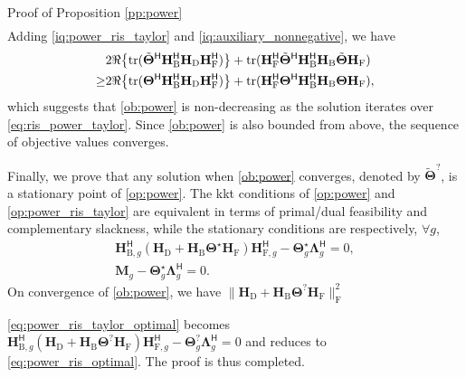 \documentclass[journal]{IEEEtran}
\begin{document}
\begin{appendix}
\begin{subsection}{Proof of Proposition \ref{pp:power}}
\begin{equation}
\begin{split}
			\end{split}
		\end{equation}
		Adding \eqref{iq:power_ris_taylor} and \eqref{iq:auxiliary_nonnegative}, we have
		\begin{equation}
			\begin{split}
				& 2 \Re \bigl\{\operatorname{tr}(\tilde{\mathbf{\Theta}}^\mathsf{H} \mathbf{H}_\mathrm{B}^\mathsf{H} \mathbf{H}_\mathrm{D} \mathbf{H}_\mathrm{F}^\mathsf{H}) \bigr\} + \operatorname{tr}(\mathbf{H}_\mathrm{F}^\mathsf{H} \tilde{\mathbf{\Theta}}^\mathsf{H} \mathbf{H}_\mathrm{B}^\mathsf{H} \mathbf{H}_\mathrm{B} \tilde{\mathbf{\Theta}} \mathbf{H}_\mathrm{F}) \\
				\ge & 2 \Re \bigl\{\operatorname{tr}({\mathbf{\Theta}}^\mathsf{H} \mathbf{H}_\mathrm{B}^\mathsf{H} \mathbf{H}_\mathrm{D} \mathbf{H}_\mathrm{F}^\mathsf{H}) \bigr\} + \operatorname{tr}(\mathbf{H}_\mathrm{F}^\mathsf{H} {\mathbf{\Theta}}^\mathsf{H} \mathbf{H}_\mathrm{B}^\mathsf{H} \mathbf{H}_\mathrm{B} {\mathbf{\Theta}} \mathbf{H}_\mathrm{F}),
			\end{split}
		\end{equation}
		which suggests that \eqref{ob:power} is non-decreasing as the solution iterates over \eqref{eq:ris_power_taylor}.
		Since \eqref{ob:power} is also bounded from above, the sequence of objective values converges.

		Finally, we prove that any solution when \eqref{ob:power} converges, denoted by $\tilde{\mathbf{\Theta}}^?$, is a stationary point of \eqref{op:power}.
		The \gls{kkt} conditions of \eqref{op:power} and \eqref{op:power_ris_taylor} are equivalent in terms of primal/dual feasibility and complementary slackness, while the stationary conditions are respectively, $\forall g$,
		\begin{gather}
			\mathbf{H}_{\mathrm{B},g}^\mathsf{H} (\mathbf{H}_\mathrm{D} + \mathbf{H}_\mathrm{B} \mathbf{\Theta}^\star \mathbf{H}_\mathrm{F}) \mathbf{H}_{\mathrm{F},g}^\mathsf{H} - \mathbf{\Theta}_g^\star \mathbf{\Lambda}_g^\mathsf{H} = 0,\label{eq:power_ris_optimal}\\
			\mathbf{M}_g - \mathbf{\Theta}_g^\star \mathbf{\Lambda}_g^\mathsf{H} = 0.\label{eq:power_ris_taylor_optimal}
		\end{gather}
		On convergence of \eqref{ob:power}, we have $\lVert \mathbf{H}_\mathrm{D} + \mathbf{H}_\mathrm{B} \mathbf{\Theta}^? \mathbf{H}_\mathrm{F} \rVert _\mathrm{F}^2$

		\eqref{eq:power_ris_taylor_optimal} becomes $\mathbf{H}_{\mathrm{B},g}^\mathsf{H} (\mathbf{H}_\mathrm{D} + \mathbf{H}_\mathrm{B} \mathbf{\Theta}^? \mathbf{H}_\mathrm{F}) \mathbf{H}_{\mathrm{F},g}^\mathsf{H} - \mathbf{\Theta}_g^? \mathbf{\Lambda}_g^\mathsf{H} = 0$ and reduces to \eqref{eq:power_ris_optimal}.
		The proof is thus completed.
	\end{subsection}


\end{appendix}
\end{document}
